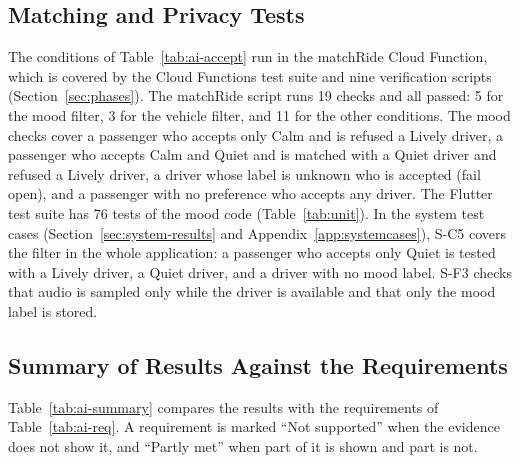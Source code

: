 \subsection{Matching and Privacy Tests}
\label{sec:ai-matchtests}
The conditions of Table~\ref{tab:ai-accept} run in the matchRide Cloud Function, which is covered by the Cloud Functions test suite and nine verification scripts (Section~\ref{sec:phases}). The matchRide script runs 19 checks and all passed: 5 for the mood filter, 3 for the vehicle filter, and 11 for the other conditions. The mood checks cover a passenger who accepts only Calm and is refused a Lively driver, a passenger who accepts Calm and Quiet and is matched with a Quiet driver and refused a Lively driver, a driver whose label is unknown who is accepted (fail open), and a passenger with no preference who accepts any driver. The Flutter test suite has 76 tests of the mood code (Table~\ref{tab:unit}). In the system test cases (Section~\ref{sec:system-results} and Appendix~\ref{app:systemcases}), S-C5 covers the filter in the whole application: a passenger who accepts only Quiet is tested with a Lively driver, a Quiet driver, and a driver with no mood label. S-F3 checks that audio is sampled only while the driver is available and that only the mood label is stored.

\subsection{Summary of Results Against the Requirements}
\label{sec:ai-summary}
Table~\ref{tab:ai-summary} compares the results with the requirements of Table~\ref{tab:ai-req}. A requirement is marked ``Not supported'' when the evidence does not show it, and ``Partly met'' when part of it is shown and part is not.

